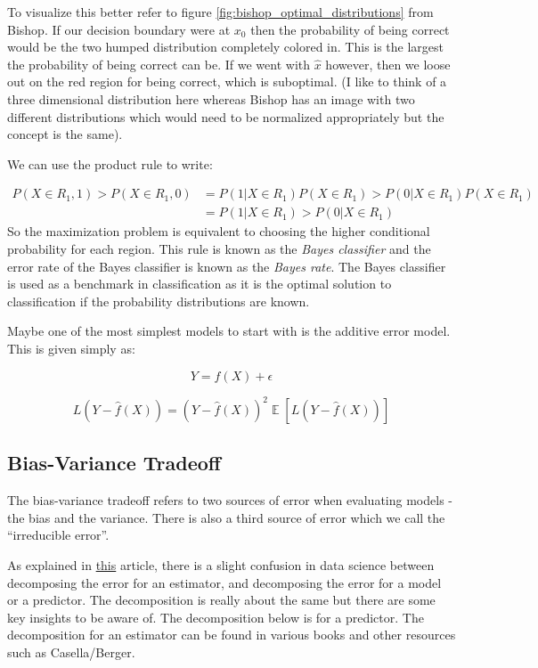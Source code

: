 \documentclass[paper=a4, fontsize=11pt]{scrartcl} %
\numberwithin{equation}{section} %
\numberwithin{figure}{section} %
\numberwithin{table}{section} %
\DeclareMathOperator{\EX}{\mathbb{E}}%
\begin{document}
To visualize this better refer to figure \ref{fig:bishop_optimal_distributions} from Bishop. If our decision boundary were at $x_0$ then the probability of being correct would be the two humped distribution completely colored in. This is the largest the probability of being correct can be. If we went with $\hat{x}$ however, then we loose out on the red region for being correct, which is suboptimal. (I like to think of a three dimensional distribution here whereas Bishop has an image with two different distributions which would need to be normalized appropriately but the concept is the same).

 We can use the product rule to write:
 
 \begin{equation}
 \begin{split}
 P(X\in R_1, 1) >  P(X\in R_1, 0)  & =  P(1|X\in R_1) P(X \in R_1) > P(0|X\in R_1) P(X \in R_1) \\
 & =  P(1|X\in R_1) > P(0|X\in R_1) 
 \end{split}
 \end{equation}
 So the maximization problem is equivalent to choosing the higher conditional probability for each region. This rule is known as the \emph{Bayes classifier} and the error rate of the Bayes classifier is known as the \emph{Bayes rate}. The Bayes classifier is used as a benchmark in classification as it is the optimal solution to classification if the probability distributions are known.


Maybe one of the most simplest models to start with is the additive error model. This is given simply as:

\begin{equation}
Y = f(X) + \epsilon
\end{equation}


\begin{equation}
L(Y - \hat{f}(X)) = (Y - \hat{f}(X))^2
\EX[L(Y - \hat{f}(X))]
\end{equation}


\subsection{Bias-Variance Tradeoff}

The bias-variance tradeoff refers to two sources of error when evaluating models - the bias and the variance. There is also a third source of error which we call the ``irreducible error''. 

As explained in \href{https://towardsdatascience.com/mse-and-bias-variance-decomposition-77449dd2ff55}{this} article, there is a slight confusion in data science between decomposing the error for an \gls{estimator}, and decomposing the error for a model or a predictor. The decomposition is really about the same but there are some key insights to be aware of. The decomposition below is for a predictor. The decomposition for an estimator can be found in various books and other resources such as Casella/Berger. 
\end{document}
